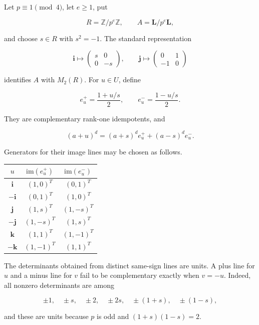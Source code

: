 \documentclass[11pt]{article}
\numberwithin{equation}{section}
\begin{document}
Let $p\equiv1\pmod4$, let $e\ge1$, put

\nopagebreak[4]
\[
R=\mathbb Z/p^e\mathbb Z,
\qquad
A=\mathbf L/p^e\mathbf L,
\]

and choose $s\in R$ with $s^2=-1$. The standard representation

\nopagebreak[4]
\[
\mathbf i\longmapsto
\begin{pmatrix}s&0\\0&-s\end{pmatrix},
\qquad
\mathbf j\longmapsto
\begin{pmatrix}0&1\\-1&0\end{pmatrix}
\]

identifies $A$ with $M_2(R)$. For $u\in U$, define

\nopagebreak[4]
\[
e_u^+=\frac{1+u/s}{2},
\qquad
e_u^-=\frac{1-u/s}{2}.
\]

They are complementary rank-one idempotents, and

\nopagebreak[4]
\[
(a+u)^d=(a+s)^d e_u^+ +(a-s)^d e_u^-.
\]

Generators for their image lines may be chosen as follows.

\begin{center}
\renewcommand{\arraystretch}{1.08}
\begin{tabular}{c c c}
\hline
$u$ & $\mathrm{im}(e_u^+)$ & $\mathrm{im}(e_u^-)$ \\
\hline
$\mathbf i$ & $(1,0)^T$ & $(0,1)^T$ \\
$-\mathbf i$ & $(0,1)^T$ & $(1,0)^T$ \\
$\mathbf j$ & $(1,s)^T$ & $(1,-s)^T$ \\
$-\mathbf j$ & $(1,-s)^T$ & $(1,s)^T$ \\
$\mathbf k$ & $(1,1)^T$ & $(1,-1)^T$ \\
$-\mathbf k$ & $(1,-1)^T$ & $(1,1)^T$ \\
\hline
\end{tabular}
\end{center}

The determinants obtained from distinct same-sign lines are units. A plus
line for $u$ and a minus line for $v$ fail to be complementary exactly when
$v=-u$. Indeed, all nonzero determinants are among

\nopagebreak[4]
\[
\pm1,\quad \pm s,\quad \pm2,\quad \pm2s,
\quad \pm(1+s),\quad \pm(1-s),
\]

and these are units because $p$ is odd and
$(1+s)(1-s)=2$.
\end{document}
